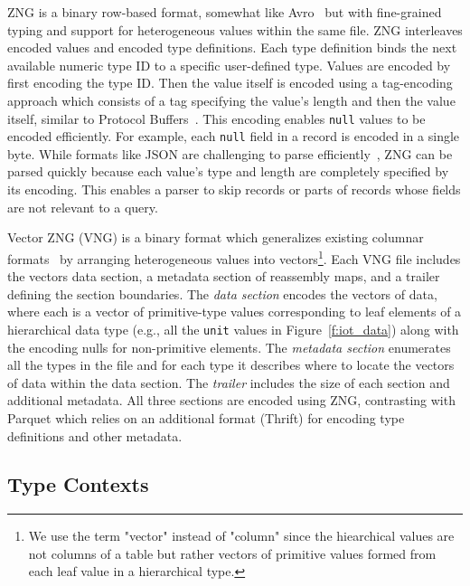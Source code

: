  ZNG is a binary row-based format, somewhat like Avro~\cite{avro} but with fine-grained typing and support for heterogeneous values within the same file. ZNG interleaves encoded values and encoded type definitions. Each type definition binds the next available numeric type ID to a specific user-defined type. Values are encoded by first encoding the type ID. Then the value itself is encoded using a tag-encoding approach which consists of a tag specifying the value's length and then the value itself, similar to Protocol Buffers~\cite{protobufs}. This encoding enables \texttt{null} values to be encoded efficiently. For example, each \texttt{null} field in a record is encoded in a single byte. While formats like JSON are challenging to parse efficiently~, ZNG can be parsed quickly because each value's type and length are completely specified by its encoding. This enables a parser to skip records or parts of records whose fields are not relevant to a query.

 Vector ZNG (VNG) is a binary format which generalizes existing columnar formats~ by arranging heterogeneous values into vectors\footnote{We use the term "vector" instead of "column" since the hiearchical values are not columns of a table but rather vectors of primitive values formed from each leaf value in a hierarchical type.}. Each VNG file includes the vectors data section, a metadata section of reassembly maps, and a trailer defining the section boundaries. The {\em data section} encodes the vectors of data, where each is a vector of primitive-type values corresponding to leaf elements of a hierarchical data type (e.g., all the \texttt{unit} values in Figure~\ref{f:iot_data}) along with the encoding nulls for non-primitive elements. The {\em metadata section} enumerates all the types in the file and for each type it describes where to locate the vectors of data within the data section. The {\em trailer} includes the size of each section and additional metadata. All three sections are encoded using ZNG, contrasting with Parquet which relies on an additional format (Thrift) for encoding type definitions and other metadata.


\subsection{ Type Contexts} \label{ss:zed_type_contexts}

